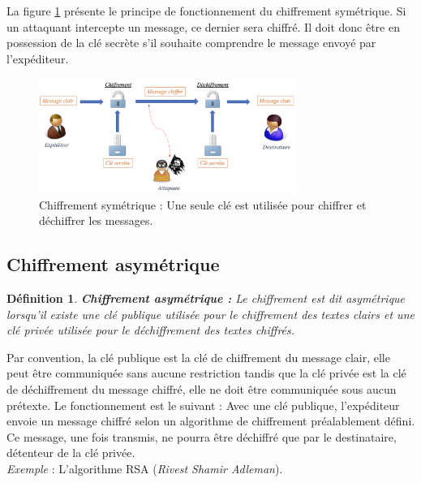 \documentclass[oneside]{book}
\newtheorem{definition}{Définition}[section]
\begin{document}
\hspace{-0.5cm}La figure \ref{fig:symétrique} présente le principe de fonctionnement du chiffrement symétrique. Si un attaquant intercepte un message, ce dernier sera chiffré. Il doit donc être en possession de la clé secrète s'il souhaite comprendre le message envoyé par l'expéditeur.

\begin{figure}[htbp]
    \centering
    \includegraphics[width=0.75\textwidth]{image/symetrique}
    \caption{Chiffrement symétrique : Une seule clé est utilisée pour chiffrer et déchiffrer les messages.}
    \label{fig:symétrique}
\end{figure}


\newpage
\subsection{Chiffrement asymétrique}
\label{subsec:Chiffrement_asymétrique}

\theoremstyle{definition}
\begin{definition}{\textbf{Chiffrement asymétrique :}}
Le chiffrement est dit asymétrique \cite{intro_crypto} lorsqu'il existe une clé publique utilisée pour le chiffrement des textes clairs et une clé privée utilisée pour le déchiffrement des textes chiffrés. 
\end{definition}

\hspace{-0.5cm}Par convention, la clé publique est la clé de chiffrement du message clair, elle peut être communiquée sans aucune restriction tandis que la clé privée est la clé de déchiffrement du message chiffré, elle ne doit être communiquée sous aucun prétexte. Le fonctionnement est le suivant : Avec une clé publique, l'expéditeur envoie un message chiffré selon un algorithme de chiffrement préalablement défini. Ce message, une fois transmis, ne pourra être déchiffré que par le destinataire, détenteur de la clé privée. \\
\textit{Exemple} : L'algorithme RSA (\textit{Rivest Shamir Adleman}).
\end{document}
